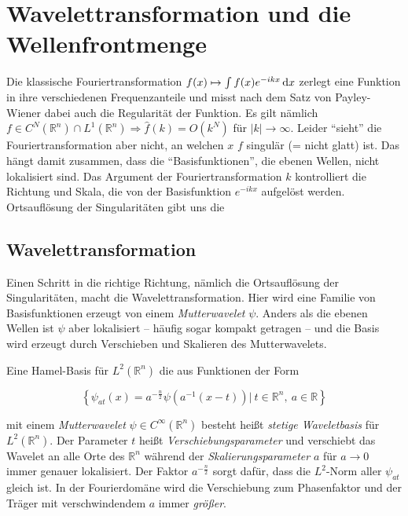 \section{Wavelettransformation und die Wellenfrontmenge} %
\label{sec:shearlets}

Die klassische Fouriertransformation $f(x) \mapsto \int f(x) e^{-ik x} \mathop{}\!\mathrm{d} x$
zerlegt eine Funktion in ihre verschiedenen Frequenzanteile und misst nach dem Satz von Payley-Wiener dabei auch die Regularität der Funktion. Es gilt nämlich $f \in C^N(\mathbb{R}^n) \cap L^1(\mathbb{R}^n) \Rightarrow \hat f(k) = O(k^N) $ für $|k| \to \infty$. Leider "`sieht"' die Fouriertransformation aber nicht, an welchen $x$ $f$ singulär (= nicht glatt) ist. Das hängt damit zusammen, dass die "`Basisfunktionen"', die ebenen Wellen, nicht lokalisiert sind. Das Argument der Fouriertransformation $k$ kontrolliert die Richtung und Skala, die von der Basisfunktion $e^{-ikx}$ aufgelöst werden. Ortsauflösung der Singularitäten gibt uns die


\subsection{Wavelettransformation} %
\label{sec:wavelettransformation}


Einen Schritt in die richtige Richtung, nämlich die Ortsauflösung der Singularitäten, macht die Wavelettransformation. Hier wird eine Familie von Basisfunktionen erzeugt von einem \textit{Mutterwavelet} $\psi$. Anders als die ebenen Wellen ist $\psi$ aber lokalisiert -- häufig sogar kompakt getragen -- und die Basis wird erzeugt durch Verschieben und Skalieren des Mutterwavelets.

Eine Hamel-Basis für $L^2(\mathbb{R}^n)$ die aus Funktionen der Form

\begin{equation*}
    \left\{\psi_{at}(x) = a^{-\frac{n}{2}}\psi\left(a^{-1}(x-t)\right)  |~ t \in \mathbb{R}^n,  ~a \in \mathbb{R}\right\}
\end{equation*}

 mit einem \textit{Mutterwavelet} $\psi \in C^\infty (\mathbb{R}^n)$ besteht heißt \textit{stetige Waveletbasis} für $L^2(\mathbb{R}^n)$. Der Parameter $t$ heißt \textit{Verschiebungsparameter} und verschiebt das Wavelet an alle Orte des $\mathbb{R}^n$ während der \textit{Skalierungsparameter} $a$ für $a \to 0$ immer genauer lokalisiert. Der Faktor $a^{-\frac{n}{2}}$ sorgt dafür, dass die $L^2$-Norm aller $\psi_{at}$ gleich ist. In der Fourierdomäne wird die Verschiebung zum Phasenfaktor und der Träger mit verschwindendem $a$ immer \emph{größer}.

